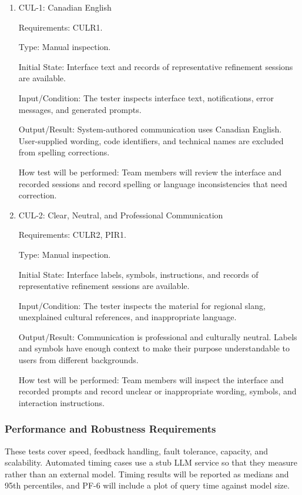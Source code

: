 \documentclass[12pt, titlepage]{article}
\begin{document}
\begin{enumerate}

\item{CUL-1: Canadian English\\}

Requirements: CULR1.

Type: Manual inspection.

Initial State: Interface text and records of representative refinement
sessions are available.

Input/Condition: The tester inspects interface text, notifications, error
messages, and generated prompts.

Output/Result: System-authored communication uses Canadian English.
User-supplied wording, code identifiers, and technical names are excluded from
spelling corrections.

How test will be performed: Team members will review the interface and
recorded sessions and record spelling or language inconsistencies that need
correction.

\item{CUL-2: Clear, Neutral, and Professional Communication\\}

Requirements: CULR2, PIR1.

Type: Manual inspection.

Initial State: Interface labels, symbols, instructions, and records of
representative refinement sessions are available.

Input/Condition: The tester inspects the material for regional slang,
unexplained cultural references, and inappropriate language.

Output/Result: Communication is professional and culturally neutral. Labels
and symbols have enough context to make their purpose understandable to users
from different backgrounds.

How test will be performed: Team members will inspect the interface and
recorded prompts and record unclear or inappropriate wording, symbols, and
interaction instructions.

\end{enumerate}

\subsubsection{Performance and Robustness Requirements}

These tests cover speed, feedback handling, fault tolerance, capacity, and
scalability. Automated timing cases use a stub LLM service so that they measure
\progname{} rather than an external model. Timing results will be reported as
medians and 95th percentiles, and PF-6 will include a plot of query time against
model size.
\end{document}
